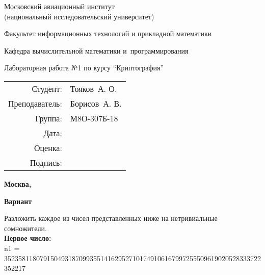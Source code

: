 \documentclass[pdf, unicode, 12pt, a4paper,oneside,fleqn]{article}
\begin{document}
\begin{titlepage}
\begin{center}
\bfseries

{\Large Московский авиационный институт\\ (национальный исследовательский университет)

}

\vspace{48pt}

{\large Факультет информационных технологий и прикладной математики
}

\vspace{36pt}


{\large Кафедра вычислительной математики и~программирования

}


\vspace{48pt}

Лабораторная работа №1 по курсу \enquote{Криптография}

\end{center}

\vspace{72pt}

\begin{flushright}
\begin{tabular}{rl}
Студент: & Тояков\ А. О. \\
Преподаватель: & Борисов\ А. В. \\
Группа: & М8О-307Б-18 \\
Дата: & \\
Оценка: & \\
Подпись: & \\
\end{tabular}
\end{flushright}

\vfill

\begin{center}
\bfseries
Москва, \the\year
\end{center}
\end{titlepage}

\textbf{Вариант }

Разложить каждое из чисел представленных ниже на нетривиальные сомножители. \\

{\bfseries Первое число:} \\

n1 = \\
352358118079150493187099355141629527101749106167997255509619020528333722352217 \\
\end{document}

